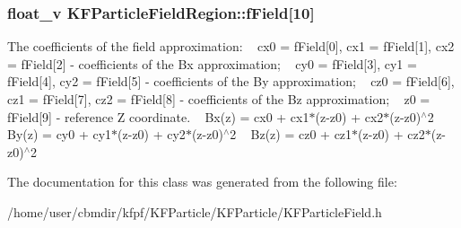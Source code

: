 \subsubsection[{\texorpdfstring{f\+Field}{fField}}]{\setlength{\rightskip}{0pt plus 5cm}float\+\_\+v K\+F\+Particle\+Field\+Region\+::f\+Field\mbox{[}10\mbox{]}}\hypertarget{classKFParticleFieldRegion_a712bf96984646afa020612aefd28bc21}{}\label{classKFParticleFieldRegion_a712bf96984646afa020612aefd28bc21}
The coefficients of the field approximation\+: ~\newline
cx0 = f\+Field\mbox{[}0\mbox{]}, cx1 = f\+Field\mbox{[}1\mbox{]}, cx2 = f\+Field\mbox{[}2\mbox{]} -\/ coefficients of the Bx approximation; ~\newline
cy0 = f\+Field\mbox{[}3\mbox{]}, cy1 = f\+Field\mbox{[}4\mbox{]}, cy2 = f\+Field\mbox{[}5\mbox{]} -\/ coefficients of the By approximation; ~\newline
cz0 = f\+Field\mbox{[}6\mbox{]}, cz1 = f\+Field\mbox{[}7\mbox{]}, cz2 = f\+Field\mbox{[}8\mbox{]} -\/ coefficients of the Bz approximation; ~\newline
z0 = f\+Field\mbox{[}9\mbox{]} -\/ reference Z coordinate. ~\newline
Bx(z) = cx0 + cx1$\ast$(z-\/z0) + cx2$\ast$(z-\/z0)$^\wedge$2 ~\newline
By(z) = cy0 + cy1$\ast$(z-\/z0) + cy2$\ast$(z-\/z0)$^\wedge$2 ~\newline
Bz(z) = cz0 + cz1$\ast$(z-\/z0) + cz2$\ast$(z-\/z0)$^\wedge$2 

The documentation for this class was generated from the following file\+:\begin{DoxyCompactItemize}
\item 
/home/user/cbmdir/kfpf/\+K\+F\+Particle/\+K\+F\+Particle/K\+F\+Particle\+Field.\+h\end{DoxyCompactItemize}

